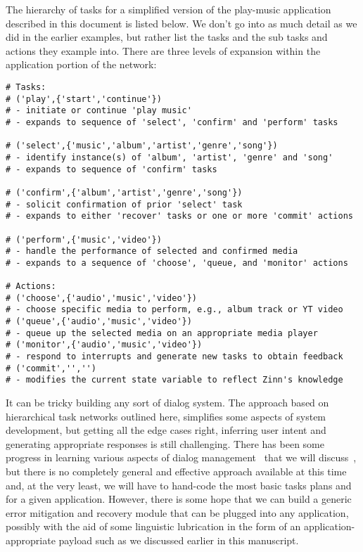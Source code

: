 \documentclass[letterpaper,12pt]{article}
\begin{document}
The hierarchy of tasks for a simplified version of the play-music application described in this document is listed below.  We don't go into as much detail as we did in the earlier examples, but rather list the tasks and the sub tasks and actions they example into.  There are three levels of expansion within the application portion of the network: 
%
\begin{verbatim}
# Tasks:
# ('play',{'start','continue'})
# - initiate or continue 'play music'
# - expands to sequence of 'select', 'confirm' and 'perform' tasks

# ('select',{'music','album','artist','genre','song'})
# - identify instance(s) of 'album', 'artist', 'genre' and 'song'
# - expands to sequence of 'confirm' tasks

# ('confirm',{'album','artist','genre','song'})
# - solicit confirmation of prior 'select' task
# - expands to either 'recover' tasks or one or more 'commit' actions

# ('perform',{'music','video'})
# - handle the performance of selected and confirmed media
# - expands to a sequence of 'choose', 'queue, and 'monitor' actions

# Actions:
# ('choose',{'audio','music','video'})
# - choose specific media to perform, e.g., album track or YT video
# ('queue',{'audio','music','video'})
# - queue up the selected media on an appropriate media player
# ('monitor',{'audio','music','video'})
# - respond to interrupts and generate new tasks to obtain feedback
# ('commit','','')
# - modifies the current state variable to reflect Zinn's knowledge
\end{verbatim}
%
It can be tricky building any sort of dialog system. The approach based on hierarchical task networks outlined here, simplifies some aspects of system development, but getting all the edge cases right, inferring user intent and generating appropriate responses is still challenging.  There has been some progress in learning various aspects of dialog management~\cite{SinghetalNIPS-99,ChotimongkolandRudnickyEMNLP-08} that we will discuss~, but there is no completely general and effective approach available at this time and, at the very least, we will have to hand-code the most basic tasks plans and for a given application. However, there is some hope that we can build a generic error mitigation and recovery module that can be plugged into any application, possibly with the aid of some linguistic lubrication in the form of an application-appropriate payload such as we discussed earlier in this manuscript.
\end{document}
